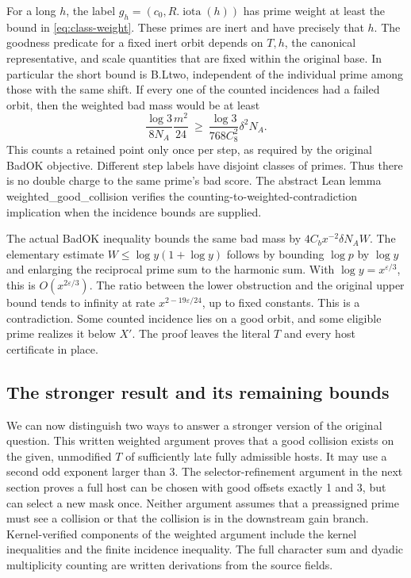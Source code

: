 \documentclass[12pt,letterpaper]{article}
\DeclareRobustCommand{\id}[1]{\mbox{\small\ttfamily #1}}
\begin{document}
For a long \(h\), the label \(g_h=(c_0,R.\operatorname{iota}(h))\) has prime weight at least the bound in \eqref{eq:class-weight}. These primes are inert and have precisely that \(h\). The goodness predicate for a fixed inert orbit depends on \(T,h\), the canonical representative, and scale quantities that are fixed within the original base. In particular the short bound is \id{B.Ltwo}, independent of the individual prime among those with the same shift. If every one of the counted incidences had a failed orbit, then the weighted bad mass would be at least
\[
                 \frac{\log3}{8N_A}\frac{m^2}{24}
                   \ \ge\ \frac{\log3}{768 C_8^2}\delta^2 N_A.
\]
This counts a retained point only once per step, as required by the original \id{BadOK} objective. Different step labels have disjoint classes of primes. Thus there is no double charge to the same prime's bad score. The abstract Lean lemma \id{weighted\_good\_collision} verifies the counting-to-weighted-contradiction implication when the incidence bounds are supplied.

The actual \id{BadOK} inequality bounds the same bad mass by \(4 C_b x^{-2}\delta N_A W\). The elementary estimate \(W\le \log y(1+\log y)\) follows by bounding \(\log p\) by \(\log y\) and enlarging the reciprocal prime sum to the harmonic sum. With \(\log y=x^{\varepsilon/3}\), this is \(O(x^{2\varepsilon/3})\). The ratio between the lower obstruction and the original upper bound tends to infinity at rate \(x^{2-19\varepsilon/24}\), up to fixed constants. This is a contradiction. Some counted incidence lies on a good orbit, and some eligible prime realizes it below \(X'\). The proof leaves the literal \(T\) and every host certificate in place.

\subsection{The stronger result and its remaining bounds}

We can now distinguish two ways to answer a stronger version of the original question. This written weighted argument proves that a good collision exists on the given, unmodified \(T\) of sufficiently late fully admissible hosts. It may use a second odd exponent larger than 3. The selector-refinement argument in the next section proves a full host can be chosen with good offsets exactly 1 and 3, but can select a new mask once. Neither argument assumes that a preassigned prime must see a collision or that the collision is in the downstream gain branch. Kernel-verified components of the weighted argument include the kernel inequalities and the finite incidence inequality. The full character sum and dyadic multiplicity counting are written derivations from the source fields.
\end{document}
